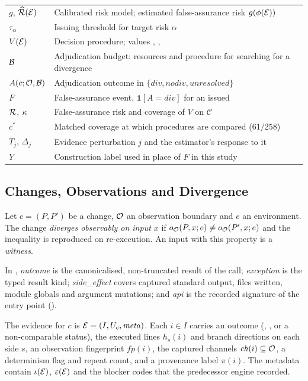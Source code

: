\begin{table}[!t]
\begin{tabular}{|L{1.25cm}|L{6.1cm}|}
$g$, $\widehat{\mathcal{R}}(\mathcal{E})$ & Calibrated risk model; estimated false-assurance risk $g(\phi(\mathcal{E}))$ \\
$\tau_\alpha$ & Issuing threshold for target risk $\alpha$ \\
$V(\mathcal{E})$ & Decision procedure; values \DIV{}, \NDO{}, \INS{} \\
$\mathcal{B}$ & Adjudication budget: resources and procedure for searching for a divergence \\
$A(c;\mathcal{O},\mathcal{B})$ & Adjudication outcome in $\{\textit{div},\textit{nodiv},\textit{unresolved}\}$ \\
$F$ & False-assurance event, $\mathbf{1}[A=\textit{div}]$ for an issued \NDO{} \\
$\mathcal{R}$, $\kappa$ & False-assurance risk and coverage of $V$ on $\mathcal{C}$ \\
$c^\ast$ & Matched coverage at which procedures are compared ($61/258$) \\
$T_j$, $\Delta_j$ & Evidence perturbation $j$ and the estimator's response to it \\
$Y$ & Construction label used in place of $F$ in this study \\
\hline
\end{tabular}
\end{table}

\subsection{Changes, Observations and Divergence}
\begin{definition}
Let $c=(P,P')$ be a change, $\mathcal{O}$ an observation boundary and $e$ an environment. The change \emph{diverges observably on input $x$} if $o_{\mathcal{O}}(P,x;e)\neq o_{\mathcal{O}}(P',x;e)$ and the inequality is reproduced on re-execution. An input with this property is a \emph{witness}.
\end{definition}
In \sbg{}, \textit{outcome} is the canonicalised, non-truncated result of the call; \textit{exception} is the typed result kind; \textit{side\_effect} covers captured standard output, files written, module globals and argument mutations; and \textit{api} is the recorded signature of the entry point ().

\begin{definition}
The evidence for $c$ is $\mathcal{E}=(I,U_c,\mathit{meta})$. Each $i\in I$ carries an outcome (, , or a non-comparable status), the executed lines $h_s(i)$ and branch directions on each side $s$, an observation fingerprint $\mathit{fp}(i)$, the captured channels $\mathit{ch}(i)\subseteq\mathcal{O}$, a determinism flag and repeat count, and a provenance label $\pi(i)$. The metadata contain $\iota(\mathcal{E})$, $\varepsilon(\mathcal{E})$ and the blocker codes that the predecessor engine recorded.
\end{definition}

